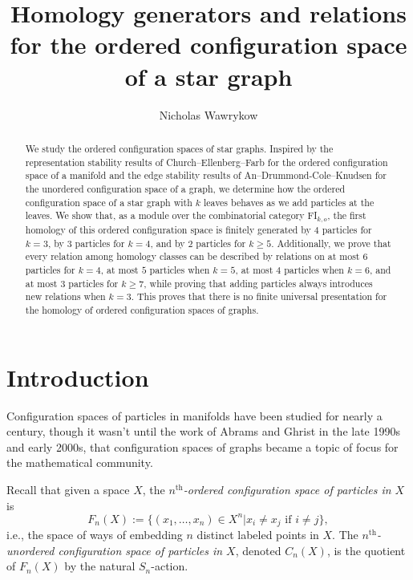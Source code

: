 \documentclass[pagebackref,colorlinks,citecolor=blue,linkcolor=blue,urlcolor=blue,filecolor=blue]{article}
\title{Homology generators and relations for the ordered configuration space of a star graph}
\author{Nicholas Wawrykow}
\date{}
\theoremstyle{definition}\newtheorem{definition}[thm]{Definition}
\theoremstyle{definition}
\begin{document}
\maketitle
\begin{abstract}
We study the ordered configuration spaces of star graphs.
Inspired by the representation stability results of Church--Ellenberg--Farb for the ordered configuration space of a manifold and the edge stability results of An--Drummond-Cole--Knudsen for the unordered configuration space of a graph, we determine how the ordered configuration space of a star graph with $k$ leaves behaves as we add particles at the leaves.
We show that, as a module over the combinatorial category FI$_{k, o}$, the first homology of this ordered configuration space is finitely generated by $4$ particles for $k=3$, by $3$ particles for $k=4$, and by $2$ particles for $k\ge 5$.
Additionally, we prove that every relation among homology classes can be described by relations on at most $6$ particles for $k=4$, at most $5$ particles when $k=5$, at most $4$ particles when $k=6$, and at most $3$ particles for $k\ge 7$, while proving that adding particles always introduces new relations when $k=3$.
This proves that there is no finite universal presentation for the homology of ordered configuration spaces of graphs.
\end{abstract}

\section{Introduction}

Configuration spaces of particles in manifolds have been studied for nearly a century, though it wasn't until the work of Abrams \cite{abrams2000configuration} and Ghrist \cite{Ghr01} in the late 1990s and early 2000s, that configuration spaces of graphs became a topic of focus for the mathematical community.

Recall that given a space $X$, the \emph{$n^{\text{th}}$-ordered configuration space of particles in $X$} is
\[
F_{n}(X):=\big\{(x_{1}, \dots, x_{n})\in X^{n}|x_{i}\neq x_{j}\mbox{ if }i\neq j\big\},
\]
i.e., the space of ways of embedding $n$ distinct labeled points in $X$.
The \emph{$n^{\text{th}}$-unordered configuration space of particles in $X$}, denoted $C_{n}(X)$,  is the quotient of $F_{n}(X)$ by the natural $S_{n}$-action.
\end{document}
